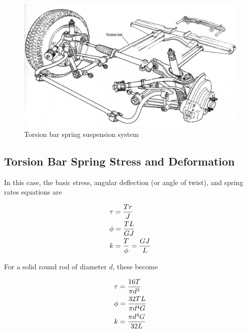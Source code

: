 \documentclass[
10pt,
a4paper,
openany,
svgnames,
]{book}
\begin{document}
\begin{figure}[h]
  \centering
  \includegraphics[scale=0.5]{pictures/Spring-design/torsion-bar-suspension}
  \caption{Torsion bar spring suspension system \cite{fooldriversuspension}}
  \label{fig: torsion bar spring}
\end{figure}

\subsection{Torsion Bar Spring Stress and Deformation}

In this case, the basic stress, angular deflection (or angle of twist), and spring rates equations are

\begin{equation}
  \begin{gathered}
    \tau  = \frac{Tr}{J} \hfill \\
    \phi  = \frac{TL}{GJ} \hfill \\
    k = \frac{T}{\phi} = \frac{GJ}{L} \hfill \\ 
  \end{gathered}
\end{equation}

For a solid round rod of diameter $d$, these become

\begin{equation}
  \begin{gathered}
    \tau  = \frac{16T}{\pi d^3} \hfill \\
    \phi  = \frac{32TL}{\pi d^4G} \hfill \\
    k = \frac{\pi d^4G}{32L} \hfill \\ 
  \end{gathered}
\end{equation}
\end{document}
